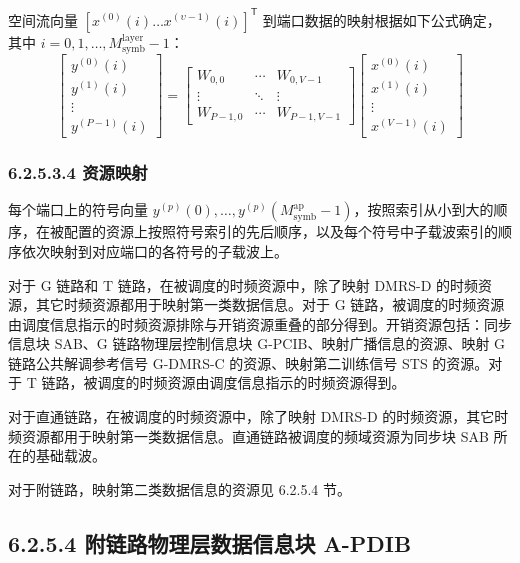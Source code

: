 \documentclass[11pt,a4paper]{ctexart}
\begin{document}
空间流向量 $[x^{(0)}(i) \ldots x^{(\upsilon-1)}(i)]^{\mathsf T}$ 到端口数据的映射根据如下公式确定，其中 $i = 0, 1, \ldots, M_{\mathrm{symb}}^{\mathrm{layer}} - 1$：
\begin{equation}
\begin{bmatrix}
y^{(0)}(i) \\ y^{(1)}(i) \\ \vdots \\ y^{(P-1)}(i)
\end{bmatrix}
=
\begin{bmatrix}
W_{0,0} & \cdots & W_{0,V-1} \\
\vdots & \ddots & \vdots \\
W_{P-1,0} & \cdots & W_{P-1,V-1}
\end{bmatrix}
\begin{bmatrix}
x^{(0)}(i) \\ x^{(1)}(i) \\ \vdots \\ x^{(V-1)}(i)
\end{bmatrix}
\end{equation}

\subsubsection{6.2.5.3.4 资源映射}

每个端口上的符号向量 $y^{(p)}(0), \ldots, y^{(p)}(M_{\mathrm{symb}}^{\mathrm{ap}} - 1)$，按照索引从小到大的顺序，在被配置的资源上按照符号索引的先后顺序，以及每个符号中子载波索引的顺序依次映射到对应端口的各符号的子载波上。

对于 G 链路和 T 链路，在被调度的时频资源中，除了映射 DMRS-D 的时频资源，其它时频资源都用于映射第一类数据信息。对于 G 链路，被调度的时频资源由调度信息指示的时频资源排除与开销资源重叠的部分得到。开销资源包括：同步信息块 SAB、G 链路物理层控制信息块 G-PCIB、映射广播信息的资源、映射 G 链路公共解调参考信号 G-DMRS-C 的资源、映射第二训练信号 STS 的资源。对于 T 链路，被调度的时频资源由调度信息指示的时频资源得到。

对于直通链路，在被调度的时频资源中，除了映射 DMRS-D 的时频资源，其它时频资源都用于映射第一类数据信息。直通链路被调度的频域资源为同步块 SAB 所在的基础载波。

对于附链路，映射第二类数据信息的资源见 6.2.5.4 节。

\subsection{6.2.5.4 附链路物理层数据信息块 A-PDIB}
\end{document}
